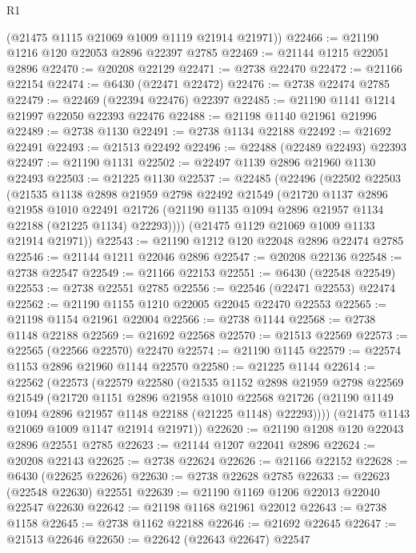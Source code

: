 \begin{lexlean}{R1}
\begin{coremodule}
      (@21475 @1115 @21069 @1009 @1119 @21914 @21971))
@22466 := @21190 @1216 @120 @22053 @2896 @22397 @2785
@22469 := @21144 @1215 @22051 @2896
@22470 := @20208 @22129
@22471 := @2738 @22470
@22472 := @21166 @22154
@22474 := @6430 (@22471 @22472)
@22476 := @2738 @22474 @2785
@22479 := @22469 (@22394 @22476) @22397
@22485 := @21190 @1141 @1214 @21997 @22050 @22393 @22476
@22488 := @21198 @1140 @21961 @21996
@22489 := @2738 @1130
@22491 := @2738 @1134 @22188
@22492 := @21692 @22491
@22493 := @21513 @22492
@22496 := @22488 (@22489 @22493) @22393
@22497 := @21190 @1131
@22502 := @22497 @1139 @2896 @21960 @1130 @22493
@22503 := @21225 @1130
@22537 := @22485
    (@22496
      (@22502
        @22503
        (@21535
          @1138
          @2898
          @21959
          @2798
          @22492
          @21549
          (@21720
            @1137
            @2896
            @21958
            @1010
            @22491
            @21726
            (@21190 @1135 @1094 @2896 @21957 @1134 @22188 (@21225 @1134) @22293))))
      (@21475 @1129 @21069 @1009 @1133 @21914 @21971))
@22543 := @21190 @1212 @120 @22048 @2896 @22474 @2785
@22546 := @21144 @1211 @22046 @2896
@22547 := @20208 @22136
@22548 := @2738 @22547
@22549 := @21166 @22153
@22551 := @6430 (@22548 @22549)
@22553 := @2738 @22551 @2785
@22556 := @22546 (@22471 @22553) @22474
@22562 := @21190 @1155 @1210 @22005 @22045 @22470 @22553
@22565 := @21198 @1154 @21961 @22004
@22566 := @2738 @1144
@22568 := @2738 @1148 @22188
@22569 := @21692 @22568
@22570 := @21513 @22569
@22573 := @22565 (@22566 @22570) @22470
@22574 := @21190 @1145
@22579 := @22574 @1153 @2896 @21960 @1144 @22570
@22580 := @21225 @1144
@22614 := @22562
    (@22573
      (@22579
        @22580
        (@21535
          @1152
          @2898
          @21959
          @2798
          @22569
          @21549
          (@21720
            @1151
            @2896
            @21958
            @1010
            @22568
            @21726
            (@21190 @1149 @1094 @2896 @21957 @1148 @22188 (@21225 @1148) @22293))))
      (@21475 @1143 @21069 @1009 @1147 @21914 @21971))
@22620 := @21190 @1208 @120 @22043 @2896 @22551 @2785
@22623 := @21144 @1207 @22041 @2896
@22624 := @20208 @22143
@22625 := @2738 @22624
@22626 := @21166 @22152
@22628 := @6430 (@22625 @22626)
@22630 := @2738 @22628 @2785
@22633 := @22623 (@22548 @22630) @22551
@22639 := @21190 @1169 @1206 @22013 @22040 @22547 @22630
@22642 := @21198 @1168 @21961 @22012
@22643 := @2738 @1158
@22645 := @2738 @1162 @22188
@22646 := @21692 @22645
@22647 := @21513 @22646
@22650 := @22642 (@22643 @22647) @22547

\end{coremodule}
\end{lexlean}
